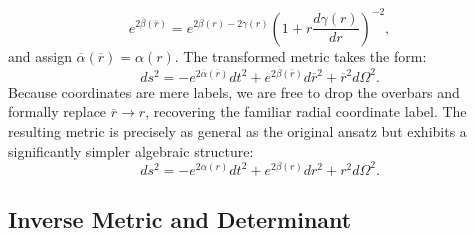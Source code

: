 \documentclass[11pt, a4paper]{report}
\begin{document}
\begin{equation}
e^{2\overline{\beta}(\overline{r})} = e^{2\beta(r) - 2\gamma(r)} \left( 1 + r \frac{d\gamma(r)}{dr} \right)^{-2},
\end{equation}
and assign $\overline{\alpha}(\overline{r}) = \alpha(r)$. The transformed metric takes the form:
\begin{equation}
ds^2 = -e^{2\overline{\alpha}(\overline{r})} dt^2 + e^{2\overline{\beta}(\overline{r})} d\overline{r}^2 + \overline{r}^2 d\Omega^2.
\end{equation}
Because coordinates are mere labels, we are free to drop the overbars and formally replace $\overline{r} \rightarrow r$, recovering the familiar radial coordinate label. The resulting metric is precisely as general as the original ansatz but exhibits a significantly simpler algebraic structure:
\begin{equation}
ds^2 = -e^{2\alpha(r)} dt^2 + e^{2\beta(r)} dr^2 + r^2 d\Omega^2.
\end{equation}



\subsection{Inverse Metric and Determinant}
\end{document}
